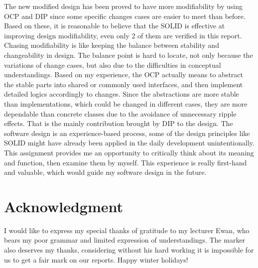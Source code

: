 \documentclass[conference]{IEEEtran}
\begin{document}
The new modified design has been proved to have more modifiability by using \gls{OCP} and \gls{DIP} since some specific changes cases are easier to meet than before. Based on these, it is reasonable to believe that the SOLID is effective at improving design modifiability, even only 2 of them are verified in this report. Chasing modifiability is like keeping the balance between stability and changeability in design. The balance point is hard to locate, not only because the variations of change cases, but also due to the difficulties in conceptual understandings. Based on my experience, the \gls{OCP} actually means to abstract the stable parts into shared or commonly used interfaces, and then implement detailed logics accordingly to changes. Since the abstractions are more stable than implementations, which could be changed in different cases, they are more dependable than concrete classes due to the avoidance of unnecessary ripple effects. That is the mainly contribution brought by \gls{DIP} to the design. The software design is an experience-based process, some of the design principles like SOLID might have already been applied in the daily development unintentionally. This assignment provides me an opportunity to critically think about its meaning and function, then examine them by myself.  This experience is really first-hand and valuable, which would guide my software design in the future. 




\Appendix


\section*{Acknowledgment}


I would like to express my special thanks of gratitude to my lecturer Ewan, who bears my poor grammar and limited expression of understandings. The marker also deserves my thanks, considering without his hard working it is impossible for us to get a fair mark on our reports. Happy winter holidays!



\printglossaries





%




\end{document}
